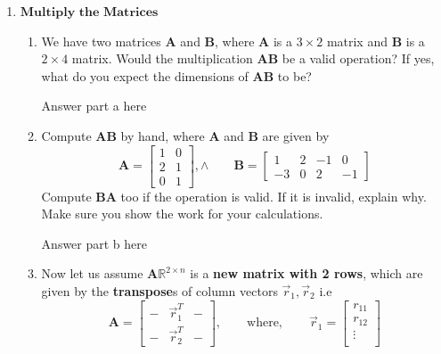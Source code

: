\documentclass[11pt]{article}
\def\R{\mathbb{R}} %
\def\A{\textbf{A}} %
\def\B{\textbf{B}}
\def\AB{\textbf{AB}}
\def\BA{\textbf{BA}}
\begin{document}
\begin{enumerate}
   \newpage
   \item $\textbf{Multiply the Matrices}$
       \begin{enumerate}
           \item We have two matrices $\A$ and $\B$, where $\A$ is a $3\times2$ matrix and $\B$ is a $2\times 4$ matrix. Would the multiplication $\AB$ be a valid operation? If yes, what do you expect the dimensions of $\AB$ to be?
           \begin{Answer}
                Answer part a here
            \end{Answer}
           \item Compute $\AB$ by hand, where $\A$ and $\B$ are given by
                \[
                    \A = \begin{bmatrix}
                        1 & 0 \\
                        2 & 1 \\
                        0 & 1
                    \end{bmatrix}, 
                    \land \qquad
                    \B = \begin{bmatrix}
                            1  & 2 & -1 & 0 \\
                            -3 & 0 & 2  & -1
                    \end{bmatrix}
                \]
            Compute $\BA$ too if the operation is valid. If it is invalid, explain why. Make sure you show the work for your calculations.
           \begin{Answer}
                Answer part b here
           \end{Answer}
           \item Now let us assume $\A  \R^{2\times n}$ is a \textbf{new matrix with 2 rows}, which are given by the \textbf{transpose}s of column vectors $\vec r_1, \vec r_2$ i.e
           \[
                    \A = \begin{bmatrix}
                        - & \vec r_1^T & - \\
                        - & \vec r_2^T & -
                        \end{bmatrix},
                    \qquad 
                    \text{where}, 
                    \qquad
                    \vec r_1 = \begin{bmatrix}
                                r_{11} \\
                                r_{12} \\
                                \vdots \\

\end{bmatrix}\]
\end{enumerate}
\end{enumerate}
\end{document}
